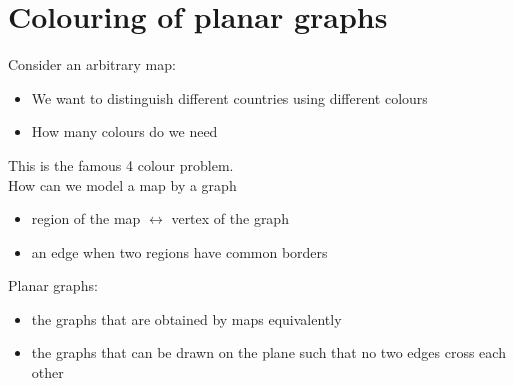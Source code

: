 \documentclass{article}[18pt]
\begin{document}
\section{Colouring of planar graphs}
Consider an arbitrary map:
\begin{itemize}
	\item We want to distinguish different countries using different colours
	\item How many colours do we need
\end{itemize}
This is the famous 4 colour problem.\\
How can we model a map by a graph
\begin{itemize}
	\item region of the map $\leftrightarrow$ vertex of the graph
	\item an edge when two regions have common borders
\end{itemize}
Planar graphs:
\begin{itemize}
	\item the graphs that are obtained by maps equivalently
	\item the graphs that can be drawn on the plane such that no two edges cross each other
\end{itemize}
\end{document}
